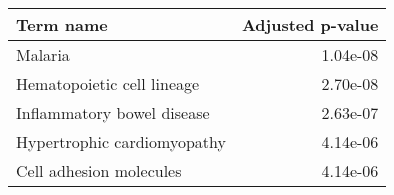 \begin{tabular}{lr}
\toprule
                   Term name &  Adjusted p-value \\
\midrule
                     Malaria &          1.04e-08 \\
  Hematopoietic cell lineage &          2.70e-08 \\
  Inflammatory bowel disease &          2.63e-07 \\
 Hypertrophic cardiomyopathy &          4.14e-06 \\
     Cell adhesion molecules &          4.14e-06 \\
\bottomrule
\end{tabular}
